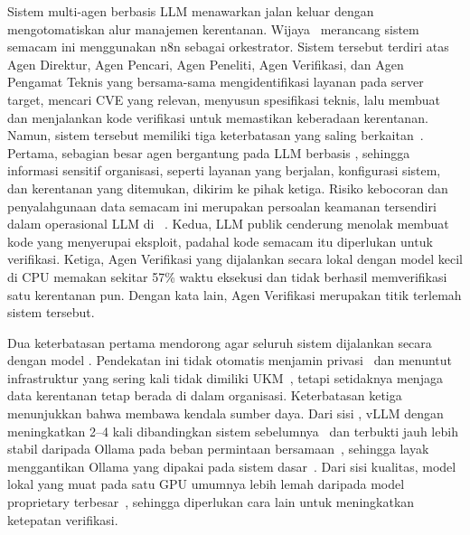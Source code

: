Sistem multi-agen berbasis LLM menawarkan jalan keluar dengan mengotomatiskan
alur manajemen kerentanan. Wijaya~\cite{wijaya2026} merancang sistem semacam ini
menggunakan n8n sebagai orkestrator. Sistem tersebut terdiri atas Agen Direktur,
Agen Pencari, Agen Peneliti, Agen Verifikasi, dan Agen Pengamat Teknis yang
bersama-sama mengidentifikasi layanan pada server target, mencari CVE yang
relevan, menyusun spesifikasi teknis, lalu membuat dan menjalankan kode
verifikasi untuk memastikan keberadaan kerentanan. Namun, sistem tersebut
memiliki tiga keterbatasan yang saling berkaitan~\cite{wijaya2026}. Pertama,
sebagian besar agen bergantung pada LLM berbasis , sehingga
informasi sensitif organisasi, seperti layanan yang berjalan, konfigurasi sistem,
dan kerentanan yang ditemukan, dikirim ke pihak ketiga. Risiko kebocoran dan
penyalahgunaan data semacam ini merupakan persoalan keamanan tersendiri dalam
operasional LLM di ~\cite{aliDoubleedgedSwordLLM2026}. Kedua, LLM
publik cenderung menolak membuat kode yang menyerupai eksploit, padahal kode
semacam itu diperlukan untuk verifikasi. Ketiga, Agen Verifikasi yang dijalankan
secara lokal dengan model kecil di CPU memakan sekitar 57\% waktu eksekusi dan
tidak berhasil memverifikasi satu kerentanan pun. Dengan kata lain, Agen
Verifikasi merupakan titik terlemah sistem tersebut.

Dua keterbatasan pertama mendorong agar seluruh sistem dijalankan secara
 dengan model . Pendekatan ini tidak
otomatis menjamin privasi~\cite{alzoubiAssessingPrivacyRisks2026} dan menuntut
infrastruktur yang sering kali tidak dimiliki UKM~\cite{Islam_2026}, tetapi
setidaknya menjaga data kerentanan tetap berada di dalam organisasi. Keterbatasan
ketiga menunjukkan bahwa  membawa kendala sumber daya. Dari
sisi , vLLM dengan  meningkatkan
 2--4 kali dibandingkan sistem
sebelumnya~\cite{kwonEfficientMemoryManagement} dan terbukti jauh lebih stabil
daripada Ollama pada beban permintaan bersamaan~\cite{ayBenchmarkingOllamaVLLM2026},
sehingga layak menggantikan Ollama yang dipakai pada sistem
dasar~\cite{wijaya2026}. Dari sisi kualitas, model lokal yang muat pada satu GPU
umumnya lebih lemah daripada model proprietary
terbesar~\cite{koterbaLeveragingLargeLanguage2026}, sehingga diperlukan cara lain
untuk meningkatkan ketepatan verifikasi.

